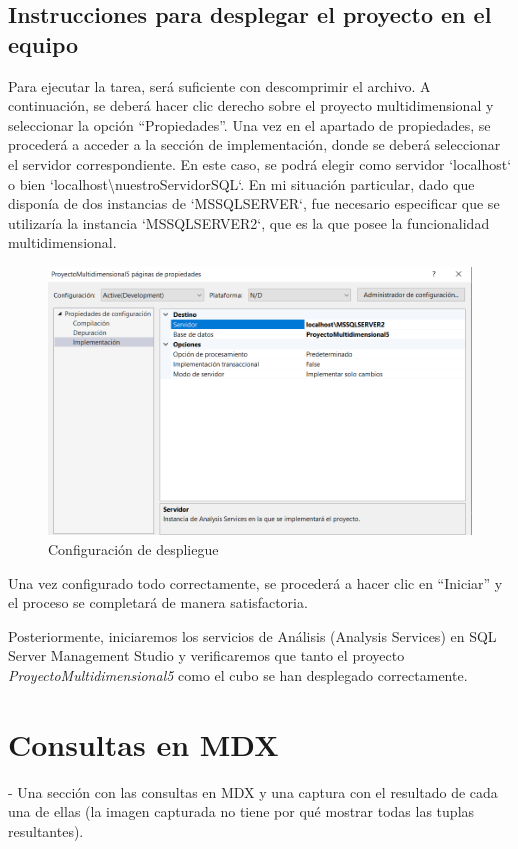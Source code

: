\documentclass[12pt, a4paper, twoside]{article}
\begin{document}
\subsection{Instrucciones para desplegar el proyecto en el equipo}
	 
	 Para ejecutar la tarea, será suficiente con descomprimir el archivo. A continuación, se deberá hacer clic derecho sobre el proyecto multidimensional y seleccionar la opción ``Propiedades''. Una vez en el apartado de propiedades, se procederá a acceder a la sección de implementación, donde se deberá seleccionar el servidor correspondiente. En este caso, se podrá elegir como servidor `localhost` o bien `localhost\textbackslash nuestroServidorSQL`. En mi situación particular, dado que disponía de dos instancias de `MSSQLSERVER`, fue necesario especificar que se utilizaría la instancia `MSSQLSERVER2`, que es la que posee la funcionalidad multidimensional.
	 
	 \begin{figure}[H]
	 	\centering
	 	\includegraphics[width=1\textwidth]{image/despliegue}
	 	\caption{Configuración de despliegue}
	 	\label{fig:3}
	 \end{figure}
	 
	 Una vez configurado todo correctamente, se procederá a hacer clic en ``Iniciar'' y el proceso se completará de manera satisfactoria. 
	 
	Posteriormente, iniciaremos los servicios de Análisis (Analysis Services) en SQL Server Management Studio y verificaremos que tanto el proyecto \textit{ProyectoMultidimensional5} como el cubo se han desplegado correctamente.
	
	 
	
	\section{Consultas en MDX}
	- Una sección con las consultas en MDX y una captura con el resultado de cada una de ellas (la imagen capturada no tiene por qué mostrar todas las tuplas resultantes). 
	
\end{document}
